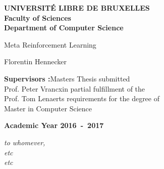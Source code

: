 \documentclass[11pt,a4paper,oneside]{book}
\begin{document}

\frontmatter
\begin{titlepage}
\begin{center}
\textbf{UNIVERSIT\'E LIBRE DE BRUXELLES}\\
\textbf{Faculty of Sciences}\\
\textbf{Department of Computer Science}
\vfill{}\vfill{}

{\Huge  Meta Reinforcement Learning}

{\Huge \par}
\begin{center}{\LARGE Florentin Hennecker}\end{center}{\Huge \par}
\vfill{}\vfill{}
\begin{flushright}{\large \textbf{Supervisors :}}\hfill{}{\large Masters Thesis submitted}\\
{\large Prof. Peter Vrancx}\hfill{}{\large in partial fulfillment of the}\\
{\large Prof. Tom Lenaerts}
\hfill{}{\large requirements for the degree of}\\
\hfill{}{\large Master in Computer Science}\end{flushright}{\large\par}
\vfill{}\vfill{}\enlargethispage{3cm}
\textbf{Academic Year 2016~-~2017}
\end{center}
\end{titlepage}
\newpage
\thispagestyle{empty} 
\null


\newenvironment{vcenterpage}
{\newpage\thispagestyle{empty} 
\vspace*{\fill}}
{\vspace*{\fill}\par\pagebreak}

\begin{vcenterpage}
\begin{flushright}
    \large\em\null\vskip1in 
    to whomever, \\
    etc\\
    etc\vfill
\end{flushright}
\end{vcenterpage}
\thispagestyle{empty}
\vspace*{5cm}

\end{document}
